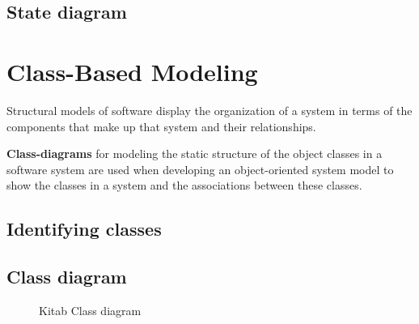	\subsection{State diagram}

	

\section{Class-Based Modeling}

Structural models of software display the organization of a system in terms of the components that make up that system and their relationships.

\textbf{Class-diagrams} for modeling the static structure of the object classes in a software system are used when developing an object-oriented system model to show the classes in a system and the associations between these classes.

	\subsection{Identifying classes}
	\subsection{Class diagram}
	
		\begin{figure}[t]
		\begin{center}
	
		\caption{Kitab Class diagram}
		\label{dia_class}
	
		\end{center}
		\end{figure}
